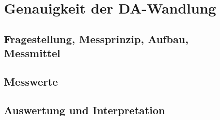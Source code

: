%
%
\chapter{Genauigkeit der DA-Wandlung}
\label{chap:VERSUCH_3}
 
\section{Fragestellung, Messprinzip, Aufbau, Messmittel}
\label{chap:VERSUCH_3_FRAGESTELLUNG}
\section{Messwerte}
\label{chap:VERSUCH_3_MESSWERTE}

\section{Auswertung und Interpretation}
\label{chap:VERSUCH_3_AUSWERTUNG}
